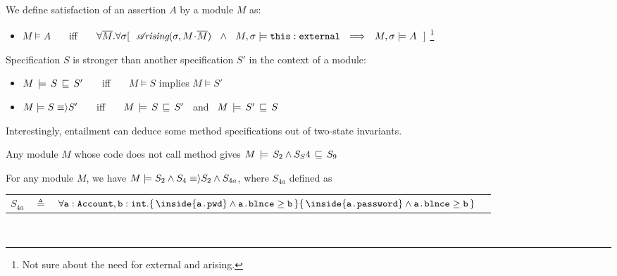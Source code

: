 {{\begin{definition} 
\label{def:assertion-inference-semantics}
We define satisfaction of an assertion $A$ by a  module $M$ as:
\begin{itemize}
\item
{
$M \models A$   \ \ \ iff \ \ \  $\forall \overline{M}. \forall \sigma
[\ \    \arising{\sigma}{M\madd\overline{M}}\   \  \wedge\ \  \satisfiesA {M}   {\sigma} {\external{\prg{this}}} 
\   \ \Longrightarrow \ \ \satisfiesA{M}{\sigma}{A}\ \ ]$
}\footnote{Not sure about the need for external and arising.}
\end{itemize}
\end{definition}


\begin{definition} 
\label{def:specification-implication-semantics}
Specification $S$ is stronger than another specification $S'$  in the context of a  module: 
 \begin{itemize}[itemsep=5pt]
\item 
$M\, \models\, S\, \sqsubseteq\, S'$   \ \ \ iff \ \ \  $M\models S$ implies $M \models S'$
\item
$M \models S  \equiv \rangle S'$   \ \ \ iff \ \ \ $M\, \models\, S\, \sqsubseteq\, S'$  \ and \  $M\, \models\, S'\, \sqsubseteq\, S$    
\end{itemize}
\end{definition}

\noindent
{Interestingly, entailment can deduce some method specifications out of two-state invariants.}

{
 \begin{example}
 \label{example:entail}
 Any module $M$ whose code does not call  method  gives   $M\, \models\, S_2 \wedge S_S4\, \sqsubseteq\, S_9$
\end{example}


\begin{example}
 \label{example:entail}
For any module $M$,  we have  $M \models S_2 \wedge S_4  \equiv \rangle S_2 \wedge S_{4a}$, where $S_{4a}$ defined as 
\\
\begin{tabular}{lcll}
  $S_{4a}$   & $\triangleq$   &  
 $ \TwoStatesQ{\prg{a}:\prg{Account},\prg{b}:\prg{int}}  {\inside{\prg{a.\password}} \wedge \prg{a.\balance}\geq\prg{b}} 
 {\inside{\prg{a.password}} \wedge \prg{a.\balance}\geq\prg{b}} $
 \end{tabular}
\ \end{example}
}
 
}}
